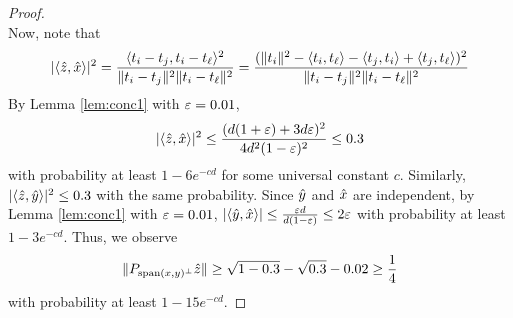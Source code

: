 \begin{proof}
$$$$
Now, note that 
$$
| \langle \hat{z}, \hat{x} \rangle |^2 = \frac{\langle t_{i} - t_{j}, t_{i} - t_{\ell} \rangle^2}{\| t_{i} - t_{j} \|^2 \| t_{i} - t_{\ell} \|^2} = \frac{(\|t_{i}\|^2 - \langle t_{i}, t_{\ell} \rangle - \langle t_{j}, t_{i} \rangle + \langle t_{j}, t_{\ell} \rangle)^2}{\| t_{i} - t_{j} \|^2 \| t_{i} - t_{\ell} \|^2}
$$
By Lemma \ref{lem:conc1} with $\varepsilon = 0.01$,
$$
| \langle \hat{z}, \hat{x}  \rangle |^2 \leq \frac{(d ( 1+ \varepsilon) + 3d \varepsilon )^2}{4 d^2 (1-\varepsilon)^2} \leq 0.3
$$
with probability at least $1 - 6 e^{-c d}$ for some universal constant $c$.   Similarly, $| \langle \hat{z}, \hat{y} \rangle |^2 \leq 0.3$ with the same probability.
Since $\hat{y}$ and $\hat{x}$ are independent, by Lemma \ref{lem:conc1} with $\varepsilon = 0.01$, $| \langle \hat{y}, \hat{x} \rangle | \leq \frac{\varepsilon d}{d (1-\varepsilon)} \leq 2 \varepsilon$ with probability at least $1 - 3 e^{-c d}$.
Thus, we observe 
$$
\| P_{\operatorname{span}(x,y)^\perp} \hat{z} \| \geq \sqrt{1 - 0.3} - \sqrt{0.3} - 0.02 \geq \frac{1}{4}
$$
with probability at least $1 - 15 e^{-c d}$. 
\end{proof}

